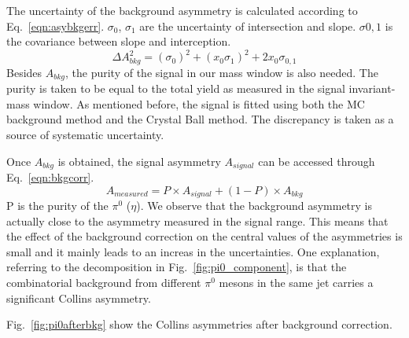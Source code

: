 The uncertainty of the background asymmetry is calculated according to Eq.~\eqref{eqn:asybkgerr}. $\sigma_0$, $\sigma_1$ are the uncertainty of intersection and slope. $\sigma{0,1}$ is the covariance between slope and interception.
\begin{equation}
\Delta A^2_{bkg}= (\sigma_0)^2 + (x_0\sigma_1)^2 + 2x_0\sigma_{0,1}
\label{eqn:asybkgerr}
\end{equation}
Besides $A_{bkg}$, the purity of the signal in our mass window is also needed. The purity is taken to be equal to the total yield as measured in the signal invariant-mass window. As mentioned before, the signal is fitted using both the MC background method and the Crystal Ball method. The discrepancy is taken as a source of systematic uncertainty.


Once $A_{bkg}$ is obtained, the signal asymmetry $A_{signal}$ can be accessed through Eq.~\eqref{eqn:bkgcorr}. 
\begin{equation}
A_{measured}=P\times A_{signal}+(1-P )\times A_{bkg}
\label{eqn:bkgcorr}
\end{equation}
P is the purity of the $\pi^0$ ($\eta$). We observe that the background asymmetry is actually close to the asymmetry measured in the  signal range. This means that the effect of the background correction on the central values of the asymmetries is small and it mainly leads to an increas in the uncertainties. One explanation, referring to the decomposition in Fig.~\ref{fig:pi0_component}, is that the combinatorial background from different $\pi^0$ mesons in the same jet carries a significant Collins asymmetry.

Fig.~\ref{fig:pi0afterbkg} show the Collins asymmetries after background correction.

